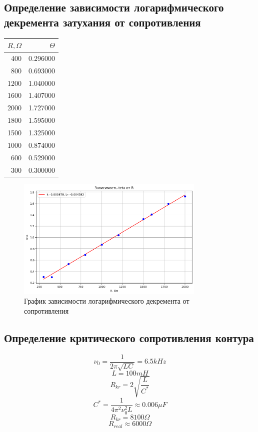 \documentclass[a4paper, 12pt]{article}
\begin{document}
\subsection{Определение зависимости логарифмического декремента затухания от сопротивления}
\begin{table}[h]
    \centering
\begin{tabular}{rr}
    \toprule
    $R, \Omega$ & $\varTheta$ \\
    \midrule
    400 & 0.296000 \\
    800 & 0.693000 \\
    1200 & 1.040000 \\
    1600 & 1.407000 \\
    2000 & 1.727000 \\
    1800 & 1.595000 \\
    1500 & 1.325000 \\
    1000 & 0.874000 \\
    600 & 0.529000 \\
    300 & 0.300000 \\
    \bottomrule
\end{tabular}
\end{table}

\begin{figure}[h!]
    \centering
    \includegraphics[width=90mm]{./imgs/лист2.png}
    \caption{График зависимости логарифмического декремента от сопротивления}
\end{figure}


\subsection{Определение критического сопротивления контура}
\[ \nu_0=\frac{1}{2\pi\sqrt{LC}} = 6.5kHz \]
\[L = 100mH\]
\[R_{kr} = 2\sqrt{\frac{L}{C^*}}\]
\[C^* = \frac{1}{4\pi^2\nu_0^2L}\approx 0.006\mu F\]
\[R_{kr} = 8100 \Omega\]
\[R_{real} \approx 6000 \Omega\]
\end{document}
